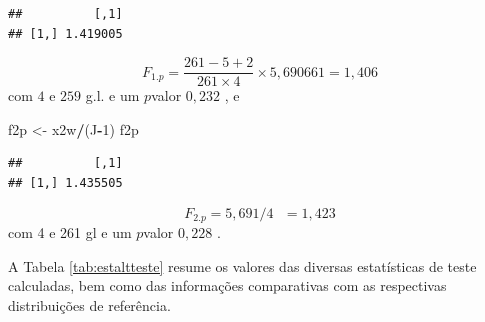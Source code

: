 \documentclass[]{book}
\newenvironment{Shaded}{\begin{snugshade}}{\end{snugshade}}
\newcommand{\DecValTok}[1]{\textcolor[rgb]{0.00,0.00,0.81}{#1}}
\newcommand{\StringTok}[1]{\textcolor[rgb]{0.31,0.60,0.02}{#1}}
\newcommand{\OperatorTok}[1]{\textcolor[rgb]{0.81,0.36,0.00}{\textbf{#1}}}
\newcommand{\NormalTok}[1]{#1}
\theoremstyle{definition}
\theoremstyle{definition}
\theoremstyle{definition}
\theoremstyle{remark}
\begin{document}
\begin{verbatim}
##          [,1]
## [1,] 1.419005
\end{verbatim}

\[
F_{1.p}=\frac{261-5+2}{261\times 4}\times 5,690661=1,406 
\] com \(4\) e \(259\) g.l. e um \(p\)valor \(0,232\) , e

\begin{Shaded}
\begin{Highlighting}[]
\NormalTok{f2p <-}\StringTok{ }\NormalTok{x2w}\OperatorTok{/}\NormalTok{(J}\OperatorTok{-}\DecValTok{1}\NormalTok{)}
\NormalTok{f2p}
\end{Highlighting}
\end{Shaded}

\begin{verbatim}
##          [,1]
## [1,] 1.435505
\end{verbatim}

\[
F_{2.p}=5,691/4\mbox{ }=1,423 
\] com 4 e 261 gl e um \(p\)valor \(0,228\) .

A Tabela \ref{tab:estaltteste} resume os valores das diversas
estatísticas de teste calculadas, bem como das informações comparativas
com as respectivas distribuições de referência.
\end{document}
